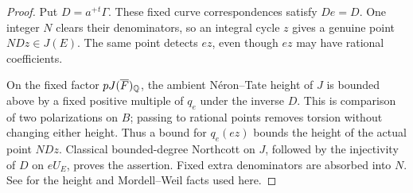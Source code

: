 \begin{proof}
Put \(D=a^+{}^t\Gamma\). These fixed curve correspondences satisfy
\(De=D\). One integer \(N\) clears their denominators, so an
integral cycle \(z\) gives a genuine point \(NDz\in J(E)\).
The same point detects \(ez\), even though \(ez\) may have
rational coefficients.

On the fixed factor \(pJ(\overline F)_\mathbb Q\), the ambient Néron--Tate
height of \(J\) is bounded above by a fixed positive multiple of
\(q_e\) under the inverse \(D\). This is comparison of two
polarizations on \(B\); passing to rational points removes
torsion without changing either height. Thus a bound for
\(q_e(ez)\) bounds the height of the actual point \(NDz\).
Classical bounded-degree Northcott on \(J\), followed by the
injectivity of \(D\) on \(eU_E\), proves the assertion. Fixed
extra denominators are absorbed into \(N\). See
\cite[Sections~9--10]{ConradFeng} for the height and Mordell--Weil
facts used here.
\end{proof}
